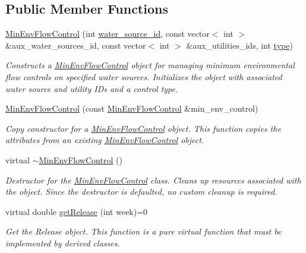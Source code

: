 \subsection*{Public Member Functions}
\begin{DoxyCompactItemize}
\item 
\mbox{\hyperlink{classMinEnvFlowControl_a093b292294d85f426c38deb6b7537d81}{Min\+Env\+Flow\+Control}} (int \mbox{\hyperlink{classMinEnvFlowControl_aada518a047598f386daec1d0358023aa}{water\+\_\+source\+\_\+id}}, const vector$<$ int $>$ \&aux\+\_\+water\+\_\+sources\+\_\+id, const vector$<$ int $>$ \&aux\+\_\+utilities\+\_\+ids, int \mbox{\hyperlink{classMinEnvFlowControl_abc3f168cd1ec36ba59e4b8604dfae8ec}{type}})
\begin{DoxyCompactList}\small\item\em Constructs a {\ttfamily \mbox{\hyperlink{classMinEnvFlowControl}{Min\+Env\+Flow\+Control}}} object for managing minimum environmental flow controls on specified water sources. Initializes the object with associated water source and utility I\+Ds and a control type. \end{DoxyCompactList}\item 
\mbox{\hyperlink{classMinEnvFlowControl_a0e12d2b8583a539d200acfc5fac795b6}{Min\+Env\+Flow\+Control}} (const \mbox{\hyperlink{classMinEnvFlowControl}{Min\+Env\+Flow\+Control}} \&min\+\_\+env\+\_\+control)
\begin{DoxyCompactList}\small\item\em Copy constructor for a {\ttfamily \mbox{\hyperlink{classMinEnvFlowControl}{Min\+Env\+Flow\+Control}}} object. This function copies the attributes from an existing {\ttfamily \mbox{\hyperlink{classMinEnvFlowControl}{Min\+Env\+Flow\+Control}}} object. \end{DoxyCompactList}\item 
virtual \mbox{\hyperlink{classMinEnvFlowControl_a3a5f44703a5a0cdeb48c948af397137d}{$\sim$\+Min\+Env\+Flow\+Control}} ()
\begin{DoxyCompactList}\small\item\em Destructor for the {\ttfamily \mbox{\hyperlink{classMinEnvFlowControl}{Min\+Env\+Flow\+Control}}} class. Cleans up resources associated with the object. Since the destructor is defaulted, no custom cleanup is required. \end{DoxyCompactList}\item 
virtual double \mbox{\hyperlink{classMinEnvFlowControl_a5de79615852eb0c937dd559a9eb9402d}{get\+Release}} (int week)=0
\begin{DoxyCompactList}\small\item\em Get the Release object. This function is a pure virtual function that must be implemented by derived classes. \end{DoxyCompactList}\item 

\end{DoxyCompactItemize}
